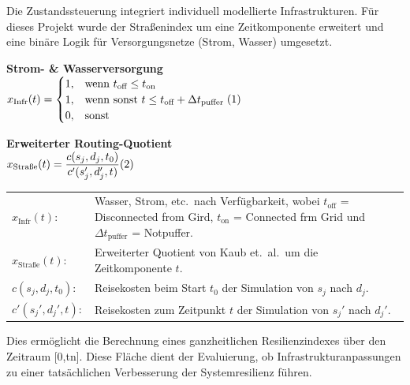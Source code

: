 \noindent
Die Zustandssteuerung integriert individuell modellierte Infrastrukturen.
Für dieses Projekt wurde der Straßenindex um eine Zeitkomponente erweitert und eine binäre Logik für Versorgungsnetze (Strom, Wasser) umgesetzt.

\vspace{2mm}

\noindent
\begin{minipage}[t]{0.58\textwidth}
    \centering
    \small
    \textbf{Strom- \& Wasserversorgung} \\[2mm]
    $\displaystyle x_{\text{Infr}}(t) = \begin{cases}
                                            1, & \text{wenn } t_{\text{off}} \le t_{\text{on}} \\
                                            1, & \text{wenn sonst } t \le t_{\text{off}} + \Delta t_{\text{puffer}} \\
                                            0, & \text{sonst}
    \end{cases} \refstepcounter{equation}(\theequation)$
\end{minipage}%
\begin{minipage}[t]{0.40\textwidth}
    \centering
    \small
    \textbf{Erweiterter Routing-Quotient} \\[2mm]
    $\displaystyle x_{\text{Straße}}(t) = \frac{c(s_j, d_j, t_0)}{c'(s_j', d_j', t)} \refstepcounter{equation}(\theequation)$
\end{minipage}

\vspace{2mm}

\noindent
\begin{tabularx}{\textwidth}{@{}l X@{}}
    $x_{\text{Infr}}(t):$ & Wasser, Strom, etc.\ nach Verfügbarkeit, wobei $t_{\text{off}}$ = Disconnected from Gird, $t_{\text{on}}$ = Connected frm Grid und $\Delta t_{\text{puffer}}$ = Notpuffer. \\
    $x_{\text{Straße}}(t):$ & Erweiterter Quotient von Kaub et. al.\ um die Zeitkomponente $t$. \\
    $c(s_j, d_j, t_0):$ & Reisekosten beim Start $t_0$ der Simulation von $s_j$ nach $d_j$. \\
    $c'(s_j', d_j', t):$ & Reisekosten zum Zeitpunkt $t$ der Simulation von $s_j'$ nach $d_j'$.
\end{tabularx}

\vspace{7mm}

\noindent
Dies ermöglicht die Berechnung eines ganzheitlichen Resilienzindexes über den Zeitraum [0,tn​].
Diese Fläche dient der Evaluierung, ob Infrastrukturanpassungen zu einer tatsächlichen Verbesserung der Systemresilienz führen.

